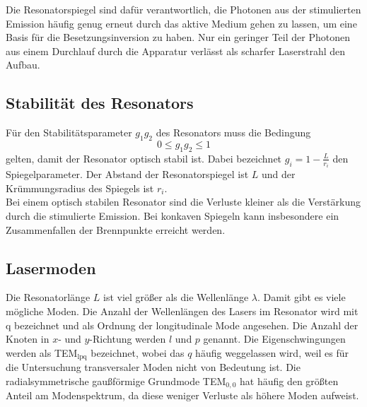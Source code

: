 Die Resonatorspiegel sind dafür verantwortlich, die Photonen aus der stimulierten Emission häufig genug erneut durch das aktive Medium gehen zu lassen, um eine Basis für die Besetzungsinversion zu haben. Nur ein geringer Teil der Photonen aus einem Durchlauf durch die Apparatur verlässt als scharfer Laserstrahl den Aufbau.

\subsection{Stabilität des Resonators}
\label{subsec:stabilitaetTheorie}
Für den Stabilitätsparameter $g_1 g_2$ des Resonators muss die Bedingung
\begin{equation}
  0 \le g_1 g_2 \le 1
  \label{eqn:stabilitaet}
\end{equation}
gelten, damit der Resonator optisch stabil ist. Dabei bezeichnet $g_i = 1 - \frac{L}{r_i}$ den Spiegelparameter. Der Abstand der Resonatorspiegel ist $L$ und der Krümmungsradius des Spiegels ist $r_i$.\\
Bei einem optisch stabilen Resonator sind die Verluste kleiner als die Verstärkung durch die stimulierte Emission. Bei konkaven Spiegeln kann insbesondere ein Zusammenfallen der Brennpunkte erreicht werden.

\subsection{Lasermoden}
\label{subsec:modenTheorie}
Die Resonatorlänge $L$ ist viel größer als die Wellenlänge $\lambda$. Damit gibt es viele mögliche Moden. Die Anzahl der Wellenlängen des Lasers im Resonator wird mit q bezeichnet und als Ordnung der longitudinale Mode angesehen. Die Anzahl der Knoten in $x$- und $y$-Richtung werden $l$ und $p$ genannt. Die Eigenschwingungen werden als TEM$_\mathrm{lpq}$ bezeichnet, wobei das $q$ häufig weggelassen wird, weil es für die Untersuchung transversaler Moden nicht von Bedeutung ist. Die radialsymmetrische gaußförmige Grundmode TEM$_{\mathrm{0,0}}$ hat häufig den größten Anteil am Modenspektrum, da diese weniger Verluste als höhere Moden aufweist.
